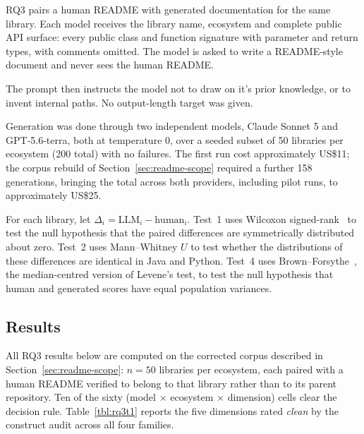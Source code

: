 \documentclass[conference]{IEEEtran}
\begin{document}
RQ3 pairs a human README with generated documentation for the same library. Each model receives the library name, ecosystem and complete public API surface: every public class and function signature with parameter and return types, with comments omitted. The model is asked to write a README-style document and never sees the human README.

The prompt then instructs the model not to draw on it's prior knowledge, or to invent internal paths. No output-length target was given.

Generation was done through two independent models, Claude Sonnet 5 and GPT-5.6-terra, both at temperature 0, over a seeded subset of 50 libraries per ecosystem (200 total) with no failures. The first run cost approximately US\$11; the corpus rebuild of Section~\ref{sec:readme-scope} required a further 158 generations, bringing the total across both providers, including pilot runs, to approximately US\$25.

For each library, let $\Delta_i = \mathrm{LLM}_i - \mathrm{human}_i$. Test~1 uses Wilcoxon signed-rank~\cite{wilcoxon1945} to test the null hypothesis that the paired differences are symmetrically distributed about zero. Test~2 uses Mann--Whitney $U$ to test whether the distributions of these differences are identical in Java and Python. Test~4 uses Brown--Forsythe~\cite{brown1974}, the median-centred version of Levene's test, to test the null hypothesis that human and generated scores have equal population variances.

\subsection{Results}

All RQ3 results below are computed on the corrected corpus described in Section~\ref{sec:readme-scope}: $n=50$ libraries per ecosystem, each paired with a human README verified to belong to that library rather than to its parent repository. Ten of the sixty (model $\times$ ecosystem $\times$ dimension) cells clear the decision rule. Table~\ref{tbl:rq3t1} reports the five dimensions rated \emph{clean} by the construct audit across all four families.
\end{document}
